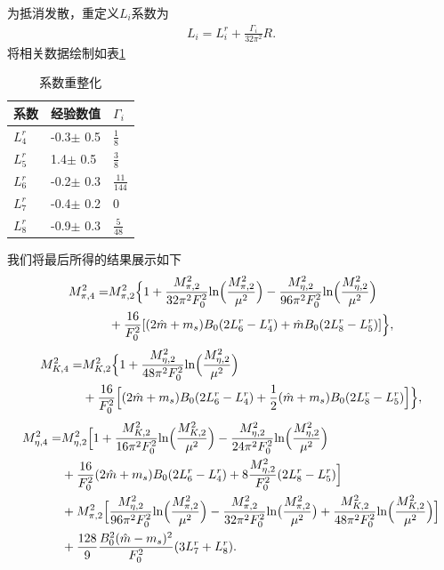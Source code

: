 \documentclass[aps,tightenlines,16pt]{ctexart}
\numberwithin{equation}{section}
\begin{document}
为抵消发散，重定义$L_i$系数为
\begin{align}
   L_i = L_i^r+\frac{\Gamma_i}{32\pi^2}R.
\end{align}
将相关数据绘制如表\ref{lr}
\begin{table}[htp]
   \centering
   \begin{tabular}{lll}
      \hline
      系数 & 经验数值 & $\Gamma_i$\\
      \hline
      $L_4^r$ & -0.3$\pm$ 0.5&$\frac{1}{8}$\\
      $L_5^r$ & 1.4$\pm$ 0.5&$\frac{3}{8}$\\
      $L_6^r$ & -0.2$\pm$ 0.3&$\frac{11}{144}$\\
      $L_7^r$ & -0.4$\pm$ 0.2&0\\
      $L_8^r$ & -0.9$\pm$ 0.3&$\frac{5}{48}$\\
      \hline
   \end{tabular}\caption{系数重整化}\label{lr}
\end{table}

我们将最后所得的结果展示如下
\begin{align}
   \begin{aligned}
   M^{2}_{\pi,4}=&M^2_{\pi,2}\Bigl\{1+\frac{M_{\pi,2}^2}{32\pi^2F_0^2}\text{ln}\Bigl(\frac{M_{\pi,2}^2}{\mu^2}\Bigr) -\frac{M_{\eta,2}^2}{96\pi^2F_0^2}\text{ln}\Bigl(\frac{M_{\eta,2}^2}{\mu^2}\Bigr) \\
   &+\frac{16}{F_0^2}[(2\hat{m}+m_s)B_0(2L_6^r-L_4^r)+\hat{m}B_0(2L_8^r-L_5^r)]\Bigr\},
   \end{aligned}
\end{align}
\begin{align}
   \begin{aligned}
      M_{K,4}^2 = &M_{K,2}^2\Bigl\{1+\frac{M_{\eta,2}^2}{48\pi^2F_0^2}\text{ln}\Bigl(\frac{M_{\eta,2}^2}{\mu^2}\Bigr)\\
      &+\frac{16}{F_0^2}\Bigl[(2\hat{m}+m_s)B_0(2L_6^r-L_4^r)+\frac{1}{2}(\hat{m}+m_s)B_0(2L_8^r-L_5^r)\Bigr]
      \Bigr\},
   \end{aligned}
\end{align}
\begin{align}
   \begin{aligned}
      M_{\eta,4}^2 =& M_{\eta,2}^2\Bigl[1+\frac{M_{K,2}^2}{16\pi^2F_0^2}\text{ln}\Bigl(\frac{M_{K,2}^2}{\mu^2}\Bigr)-\frac{M_{\eta,2}^2}{24\pi^2F_0^2}\text{ln}\Bigl(\frac{M_{\eta,2}^2}{\mu^2}\Bigr)\\
      &+\frac{16}{F_0^2}(2\hat{m}+m_s)B_0(2L_6^r-L_4^r)+8\frac{M_{\eta,2}^2}{F_0^2}(2L_8^r-L_5^r)\Bigr]\\
      &+M_{\pi,2}^2\Bigl[\frac{M_{\eta,2}^2}{96\pi^2F_0^2}\text{ln}\Bigl(\frac{M_{\pi,2}^2}{\mu^2}\Bigr)-\frac{M_{\pi,2}^2}{32\pi^2F_0^2}\text{ln}\bigl(\frac{M_{\pi,2}^2}{\mu^2}\bigr)+\frac{M_{K,2}^2}{48\pi^2F_0^2}\text{ln}\Bigl(\frac{M_{K,2}^2}{\mu^2}\Bigr)\Bigr]\\
      &+\frac{128}{9}\frac{B_0^2(\hat{m}-m_s)^2}{F_0^2}(3L_7^r+L_8^r).
   \end{aligned}
\end{align}




\newpage 

\renewcommand\refname{参考文献}




\end{document}
